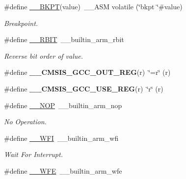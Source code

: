 \begin{DoxyCompactItemize}
\#define \mbox{\hyperlink{group___c_m_s_i_s___core___instruction_interface_ga15ea6bd3c507d3e81c3b3a1258e46397}{\+\_\+\+\_\+\+B\+K\+PT}}(value)~\+\_\+\+\_\+\+A\+SM volatile (\char`\"{}bkpt \char`\"{}\#value)
\begin{DoxyCompactList}\small\item\em Breakpoint. \end{DoxyCompactList}\item 
\#define \mbox{\hyperlink{group___c_m_s_i_s___core___instruction_interface_gab83768933a612816fad669db5488366f}{\+\_\+\+\_\+\+R\+B\+IT}}~\+\_\+\+\_\+builtin\+\_\+arm\+\_\+rbit
\begin{DoxyCompactList}\small\item\em Reverse bit order of value. \end{DoxyCompactList}\item 
\mbox{\label{group___c_m_s_i_s___core___instruction_interface_gabc17e391c13c71702366c67cba39c276}} 
\#define {\bfseries \+\_\+\+\_\+\+C\+M\+S\+I\+S\+\_\+\+G\+C\+C\+\_\+\+O\+U\+T\+\_\+\+R\+EG}(r)~\char`\"{}=r\char`\"{} (r)
\item 
\mbox{\label{group___c_m_s_i_s___core___instruction_interface_ga9d94dee7402367961d2cf0accc00fd97}} 
\#define {\bfseries \+\_\+\+\_\+\+C\+M\+S\+I\+S\+\_\+\+G\+C\+C\+\_\+\+U\+S\+E\+\_\+\+R\+EG}(r)~\char`\"{}r\char`\"{} (r)
\item 
\#define \mbox{\hyperlink{group___c_m_s_i_s___core___instruction_interface_gabd585ddc865fb9b7f2493af1eee1a572}{\+\_\+\+\_\+\+N\+OP}}~\+\_\+\+\_\+builtin\+\_\+arm\+\_\+nop
\begin{DoxyCompactList}\small\item\em No Operation. \end{DoxyCompactList}\item 
\#define \mbox{\hyperlink{group___c_m_s_i_s___core___instruction_interface_gad23bf2b78a9a4524157c9de0d30b7448}{\+\_\+\+\_\+\+W\+FI}}~\+\_\+\+\_\+builtin\+\_\+arm\+\_\+wfi
\begin{DoxyCompactList}\small\item\em Wait For Interrupt. \end{DoxyCompactList}\item 
\#define \mbox{\hyperlink{group___c_m_s_i_s___core___instruction_interface_gaac6cc7dd4325d9cb40d3290fa5244b3d}{\+\_\+\+\_\+\+W\+FE}}~\+\_\+\+\_\+builtin\+\_\+arm\+\_\+wfe

\end{DoxyCompactItemize}

